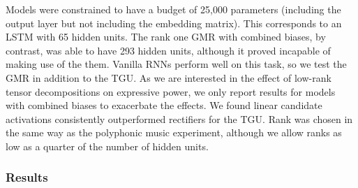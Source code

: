 Models were constrained to have a budget of 25,000 parameters (including the output layer but
not including the embedding matrix). This corresponds to
an LSTM with 65 hidden units. The rank one GMR with combined 
biases, by contrast,
was able to have 293 hidden units, although it proved incapable of making use of the them. Vanilla RNNs
perform well on this task, so we test the GMR in addition to the TGU. As we are interested
in the effect of low-rank tensor decompositions on expressive power, we only report results for models
with combined biases to exacerbate the effects.
We found linear candidate activations consistently outperformed rectifiers for
the TGU.
Rank was chosen in the same way as the polyphonic music experiment, although we allow ranks as low as
a quarter of the number of hidden units.

\subsubsection{Results}
